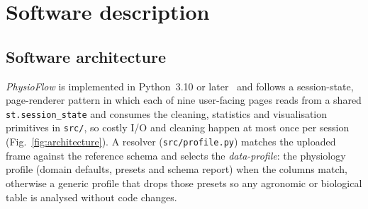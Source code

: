 \documentclass[11pt, letterpaper]{article}
\begin{document}
\section{Software description}\label{sec:software}

\subsection{Software architecture}\label{sec:arch}

\emph{PhysioFlow} is implemented in Python~3.10 or later~\cite{Streamlit,McKinney2010,Harris2020} and follows a session-state, page-renderer pattern in which each of nine user-facing pages reads from a shared \texttt{st.session\_state} and consumes the cleaning, statistics and visualisation primitives in \texttt{src/}, so costly I/O and cleaning happen at most once per session (Fig.~\ref{fig:architecture}). A resolver (\texttt{src/profile.py}) matches the uploaded frame against the reference schema and selects the \emph{data-profile}: the physiology profile (domain defaults, presets and schema report) when the columns match, otherwise a generic profile that drops those presets so any agronomic or biological table is analysed without code changes.
\end{document}
